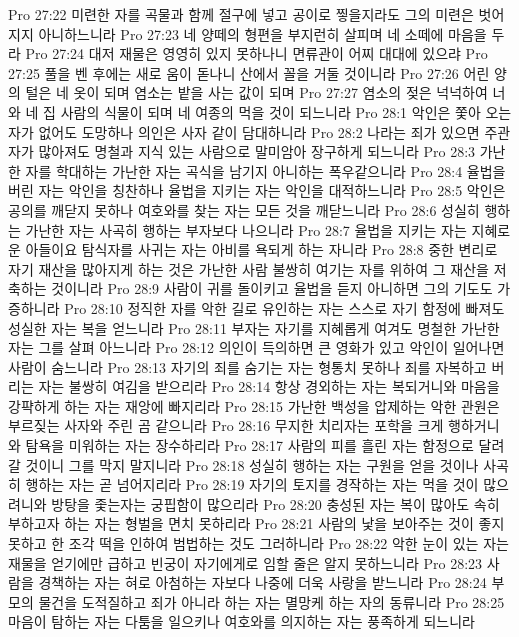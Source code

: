 Pro 27:22  미련한 자를 곡물과 함께 절구에 넣고 공이로 찧을지라도 그의 미련은 벗어지지 아니하느니라
Pro 27:23  네 양떼의 형편을 부지런히 살피며 네 소떼에 마음을 두라
Pro 27:24  대저 재물은 영영히 있지 못하나니 면류관이 어찌 대대에 있으랴
Pro 27:25  풀을 벤 후에는 새로 움이 돋나니 산에서 꼴을 거둘 것이니라
Pro 27:26  어린 양의 털은 네 옷이 되며 염소는 밭을 사는 값이 되며
Pro 27:27  염소의 젖은 넉넉하여 너와 네 집 사람의 식물이 되며 네 여종의 먹을 것이 되느니라
Pro 28:1  악인은 쫓아 오는 자가 없어도 도망하나 의인은 사자 같이 담대하니라
Pro 28:2  나라는 죄가 있으면 주관자가 많아져도 명철과 지식 있는 사람으로 말미암아 장구하게 되느니라
Pro 28:3  가난한 자를 학대하는 가난한 자는 곡식을 남기지 아니하는 폭우같으니라
Pro 28:4  율법을 버린 자는 악인을 칭찬하나 율법을 지키는 자는 악인을 대적하느니라
Pro 28:5  악인은 공의를 깨닫지 못하나 여호와를 찾는 자는 모든 것을 깨닫느니라
Pro 28:6  성실히 행하는 가난한 자는 사곡히 행하는 부자보다 나으니라
Pro 28:7  율법을 지키는 자는 지혜로운 아들이요 탐식자를 사귀는 자는 아비를 욕되게 하는 자니라
Pro 28:8  중한 변리로 자기 재산을 많아지게 하는 것은 가난한 사람 불쌍히 여기는 자를 위하여 그 재산을 저축하는 것이니라
Pro 28:9  사람이 귀를 돌이키고 율법을 듣지 아니하면 그의 기도도 가증하니라
Pro 28:10  정직한 자를 악한 길로 유인하는 자는 스스로 자기 함정에 빠져도 성실한 자는 복을 얻느니라
Pro 28:11  부자는 자기를 지혜롭게 여겨도 명철한 가난한 자는 그를 살펴 아느니라
Pro 28:12  의인이 득의하면 큰 영화가 있고 악인이 일어나면 사람이 숨느니라
Pro 28:13  자기의 죄를 숨기는 자는 형통치 못하나 죄를 자복하고 버리는 자는 불쌍히 여김을 받으리라
Pro 28:14  항상 경외하는 자는 복되거니와 마음을 강퍅하게 하는 자는 재앙에 빠지리라
Pro 28:15  가난한 백성을 압제하는 악한 관원은 부르짖는 사자와 주린 곰 같으니라
Pro 28:16  무지한 치리자는 포학을 크게 행하거니와 탐욕을 미워하는 자는 장수하리라
Pro 28:17  사람의 피를 흘린 자는 함정으로 달려갈 것이니 그를 막지 말지니라
Pro 28:18  성실히 행하는 자는 구원을 얻을 것이나 사곡히 행하는 자는 곧 넘어지리라
Pro 28:19  자기의 토지를 경작하는 자는 먹을 것이 많으려니와 방탕을 좇는자는 궁핍함이 많으리라
Pro 28:20  충성된 자는 복이 많아도 속히 부하고자 하는 자는 형벌을 면치 못하리라
Pro 28:21  사람의 낯을 보아주는 것이 좋지 못하고 한 조각 떡을 인하여 범법하는 것도 그러하니라
Pro 28:22  악한 눈이 있는 자는 재물을 얻기에만 급하고 빈궁이 자기에게로 임할 줄은 알지 못하느니라
Pro 28:23  사람을 경책하는 자는 혀로 아첨하는 자보다 나중에 더욱 사랑을 받느니라
Pro 28:24  부모의 물건을 도적질하고 죄가 아니라 하는 자는 멸망케 하는 자의 동류니라
Pro 28:25  마음이 탐하는 자는 다툼을 일으키나 여호와를 의지하는 자는 풍족하게 되느니라
